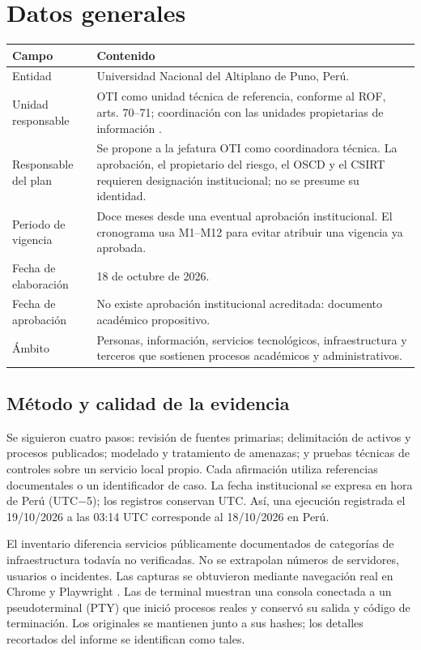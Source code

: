 \documentclass[10pt,a4paper]{article}
\newcommand{\cabecera}[1]{\textbf{#1}}
\begin{document}
\section{Datos generales}
\begin{tabularx}{\linewidth}{P{39mm}Y}
\toprule
\cabecera{Campo} & \cabecera{Contenido}\\\midrule
Entidad & Universidad Nacional del Altiplano de Puno, Perú.\\
Unidad responsable & OTI como unidad técnica de referencia, conforme al ROF, arts. 70--71; coordinación con las unidades propietarias de información \cite{R02}.\\
Responsable del plan & Se propone a la jefatura OTI como coordinadora técnica. La aprobación, el propietario del riesgo, el OSCD y el CSIRT requieren designación institucional; no se presume su identidad.\\
Periodo de vigencia & Doce meses desde una eventual aprobación institucional. El cronograma usa M1--M12 para evitar atribuir una vigencia ya aprobada.\\
Fecha de elaboración & 18 de octubre de 2026.\\
Fecha de aprobación & No existe aprobación institucional acreditada: documento académico propositivo.\\
Ámbito & Personas, información, servicios tecnológicos, infraestructura y terceros que sostienen procesos académicos y administrativos.\\
\bottomrule
\end{tabularx}

\subsection{Método y calidad de la evidencia}
Se siguieron cuatro pasos: revisión de fuentes primarias; delimitación de activos y procesos publicados; modelado y tratamiento de amenazas; y pruebas técnicas de controles sobre un servicio local propio. Cada afirmación utiliza referencias documentales o un identificador de caso. La fecha institucional se expresa en hora de Perú (UTC$-$5); los registros conservan UTC. Así, una ejecución registrada el 19/10/2026 a las 03:14 UTC corresponde al 18/10/2026 en Perú.

El inventario diferencia servicios públicamente documentados de categorías de infraestructura todavía no verificadas. No se extrapolan números de servidores, usuarios o incidentes. Las capturas se obtuvieron mediante navegación real en Chrome y Playwright \cite{R23}. Las de terminal muestran una consola conectada a un pseudoterminal (PTY) que inició procesos reales y conservó su salida y código de terminación. Los originales se mantienen junto a sus hashes; los detalles recortados del informe se identifican como tales.
\end{document}
